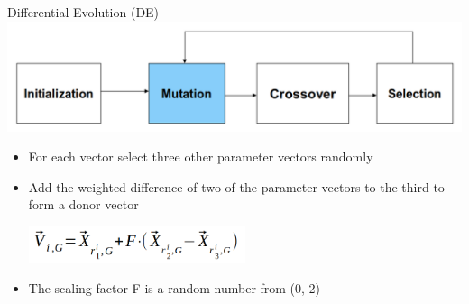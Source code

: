 \begin{frame}{Differential Evolution (DE)}
\centering
\includegraphics[width=1.0\textwidth]{new_images/DE4.png}\\
\begin{itemize}
    \item For each vector select three other parameter vectors randomly
    \item Add the weighted difference of two of the parameter vectors to the third to form a donor vector\\
    \begin{center}
        \includegraphics[width=0.5\textwidth]{new_images/DE5.png}
    \end{center}
    \item The scaling factor F is a random number from (0, 2)
\end{itemize}

\end{frame}


